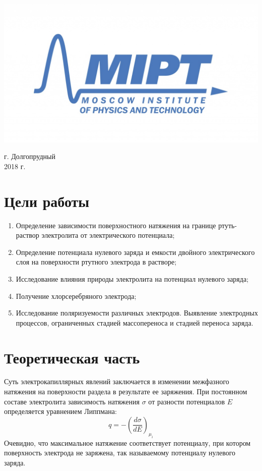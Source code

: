 \documentclass[a4paper, 12pt]{article}
\newenvironment{bottompar}{\par\vspace*{\fill}}{\clearpage}
\begin{document}
\begin{titlepage}
\begin{bottompar}
	\begin{center}
		\includegraphics[width = 80 mm]{logo.jpg}
	\end{center}
	{\large г. Долгопрудный\\2018 г.}

\end{bottompar}
\vfill %

\end{titlepage}

\setcounter{page}{2}

\newpage
\section{Цели работы}
	\begin{enumerate}
	
		\item 
		Определение зависимости поверхностного натяжения на границе ртуть-раствор
электролита от электрического потенциала;
		\item 
		 Определение потенциала нулевого заряда и емкости двойного электрического
слоя на поверхности ртутного электрода в растворе;
		\item 
		 Исследование влияния природы электролита на потенциал нулевого заряда;
		\item 
		 Получение хлорсеребряного электрода;
		\item 
		 Исследование поляризуемости различных электродов. Выявление электродных процессов, ограниченных стадией массопереноса и стадией переноса заряда.
			
	\end{enumerate}
	
\section{Теоретическая часть}
Суть электрокапиллярных явлений заключается в изменении межфазного натяжения на поверхности раздела в результате ее заряжения. При постоянном составе электролита зависимость натяжения $\sigma$ от разности потенциалов $E$ определяется уравнением Липпмана:
\begin{equation}\label{lipman}
q=-\left(\frac{d\sigma}{dE}\right)_{\mu_i}
\end{equation}
Очевидно, что максимальное натяжение соответствует потенциалу, при котором
поверхность электрода не заряжена, так называемому потенциалу нулевого
заряда.\\
\end{document}
